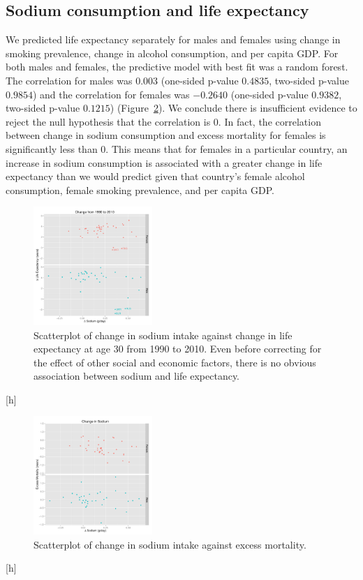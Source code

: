 \documentclass{article}
\begin{document}
\subsection{Sodium consumption and life expectancy}
We predicted life expectancy separately for males and females using change in smoking prevalence, change in alcohol consumption, and per capita GDP.  For both males and females, the predictive model with best fit was a random forest.  The correlation for males was $0.003$ (one-sided p-value $0.4835$, two-sided p-value $0.9854$) and the correlation for females was $-0.2640$ (one-sided p-value $0.9382$, two-sided p-value $0.1215$) (Figure~\ref{fig:sodium_excessmortality}). We conclude there is insufficient evidence to reject the null hypothesis that the correlation is $0$.  In fact, the correlation between change in sodium consumption and excess mortality for females is significantly less than $0$.  This means that for females in a particular country, an increase in sodium consumption is associated with a greater change in life expectancy than we would predict given that country's female alcohol consumption, female smoking prevalence, and per capita GDP. \\



\begin{figure}[h]
\centering
\includegraphics[width = 0.4\textwidth]{sodium_lifeexp.pdf}
\caption{Scatterplot of change in sodium intake against change in life expectancy at age 30 from 1990 to 2010. Even before correcting for the effect of other social and economic factors, there is no obvious association between sodium and life expectancy.}\label{fig:sodium_lifeexp}
\end{figure}[h]

\begin{figure}[h]
\centering
\includegraphics[width = 0.4\textwidth]{sodium_exmort.pdf}
\caption{Scatterplot of change in sodium intake against excess mortality.}\label{fig:sodium_excessmortality}
\end{figure}[h]
\end{document}

